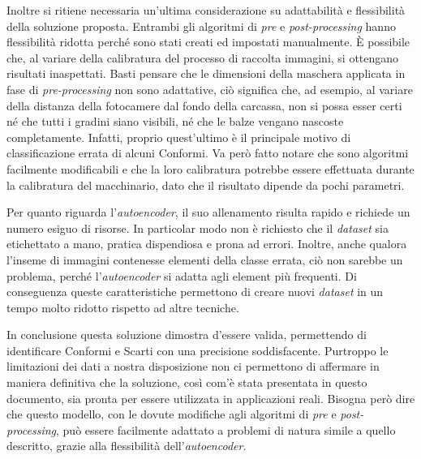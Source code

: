 Inoltre si ritiene necessaria un'ultima considerazione su adattabilità e flessibilità della soluzione proposta.
Entrambi gli algoritmi di \textit{pre} e \textit{post-processing} hanno flessibilità ridotta perché sono stati creati ed impostati manualmente.
È possibile che, al variare della calibratura del processo di raccolta immagini, si ottengano risultati inaspettati.
Basti pensare che le dimensioni della maschera applicata in fase di \textit{pre-processing} non sono adattative, ciò significa che, ad esempio, al variare della distanza della fotocamere dal fondo della carcassa, non si possa esser certi né che tutti i gradini siano visibili, né che le balze vengano nascoste completamente.
Infatti, proprio quest'ultimo è il principale motivo di classificazione errata di alcuni Conformi.
Va però fatto notare che sono algoritmi facilmente modificabili e che la loro calibratura potrebbe essere effettuata durante la calibratura del macchinario, dato che il risultato dipende da pochi parametri.

Per quanto riguarda l'\textit{autoencoder}, il suo allenamento risulta rapido e richiede un numero esiguo di risorse.
In particolar modo non è richiesto che il \textit{dataset} sia etichettato a mano, pratica dispendiosa e prona ad errori.
Inoltre, anche qualora l'inseme di immagini contenesse elementi della classe errata, ciò non sarebbe un problema, perché l'\textit{autoencoder} si adatta agli element più frequenti.
Di conseguenza queste caratteristiche permettono di creare nuovi \textit{dataset} in un tempo molto ridotto rispetto ad altre tecniche.

In conclusione questa soluzione dimostra d'essere valida, permettendo di identificare Conformi e Scarti con una precisione soddisfacente.
Purtroppo le limitazioni dei dati a nostra disposizione non ci permettono di affermare in maniera definitiva che la soluzione, così com'è stata presentata in questo documento, sia pronta per essere utilizzata in applicazioni reali.
Bisogna però dire che questo modello, con le dovute modifiche agli algoritmi di \textit{pre} e \textit{post-processing}, può essere facilmente adattato a problemi di natura simile a quello descritto, grazie alla flessibilità dell'\textit{autoencoder}.


